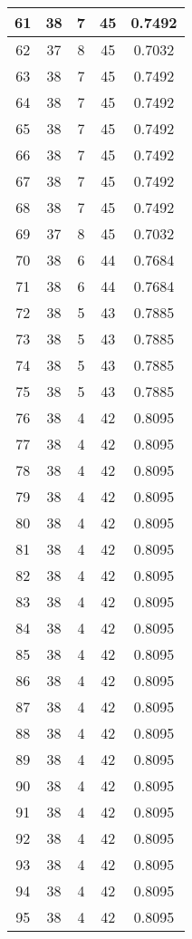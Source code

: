 \documentclass[letterpaper, 12pt]{article}
\begin{document}
\begin{longtable}{|c|c|c|c|c|}
61 & 38 & 7 & 45 & 0.7492 \\
\hline
62 & 37 & 8 & 45 & 0.7032 \\
\hline
63 & 38 & 7 & 45 & 0.7492 \\
\hline
64 & 38 & 7 & 45 & 0.7492 \\
\hline
65 & 38 & 7 & 45 & 0.7492 \\
\hline
66 & 38 & 7 & 45 & 0.7492 \\
\hline
67 & 38 & 7 & 45 & 0.7492 \\
\hline
68 & 38 & 7 & 45 & 0.7492 \\
\hline
69 & 37 & 8 & 45 & 0.7032 \\
\hline
70 & 38 & 6 & 44 & 0.7684 \\
\hline
71 & 38 & 6 & 44 & 0.7684 \\
\hline
72 & 38 & 5 & 43 & 0.7885 \\
\hline
73 & 38 & 5 & 43 & 0.7885 \\
\hline
74 & 38 & 5 & 43 & 0.7885 \\
\hline
75 & 38 & 5 & 43 & 0.7885 \\
\hline
76 & 38 & 4 & 42 & 0.8095 \\
\hline
77 & 38 & 4 & 42 & 0.8095 \\
\hline
78 & 38 & 4 & 42 & 0.8095 \\
\hline
79 & 38 & 4 & 42 & 0.8095 \\
\hline
80 & 38 & 4 & 42 & 0.8095 \\
\hline
81 & 38 & 4 & 42 & 0.8095 \\
\hline
82 & 38 & 4 & 42 & 0.8095 \\
\hline
83 & 38 & 4 & 42 & 0.8095 \\
\hline
84 & 38 & 4 & 42 & 0.8095 \\
\hline
85 & 38 & 4 & 42 & 0.8095 \\
\hline
86 & 38 & 4 & 42 & 0.8095 \\
\hline
87 & 38 & 4 & 42 & 0.8095 \\
\hline
88 & 38 & 4 & 42 & 0.8095 \\
\hline
89 & 38 & 4 & 42 & 0.8095 \\
\hline
90 & 38 & 4 & 42 & 0.8095 \\
\hline
91 & 38 & 4 & 42 & 0.8095 \\
\hline
92 & 38 & 4 & 42 & 0.8095 \\
\hline
93 & 38 & 4 & 42 & 0.8095 \\
\hline
94 & 38 & 4 & 42 & 0.8095 \\
\hline
95 & 38 & 4 & 42 & 0.8095 \\

\end{longtable}
\end{document}
